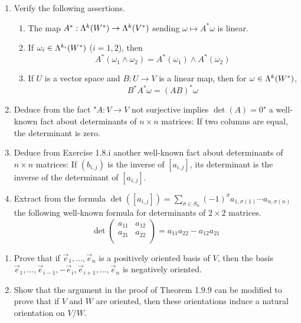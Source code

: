 \documentclass[../psets.tex]{subfiles}
\begin{document}
\begin{enumerate}[label={\textbf{1.8.\roman*.}}]
    \item Verify the following assertions.
    \begin{enumerate}
        \item The map $A^*:\lam[k]{W^*}\to\lam[k]{V^*}$ sending $\omega\mapsto A^*\omega$ is linear.
        \item If $\omega_i\in\lam[k_i]{W^*}$ ($i=1,2$), then
        \begin{equation*}
            A^*(\omega_1\wedge\omega_2) = A^*(\omega_1)\wedge A^*(\omega_2)
        \end{equation*}
        \item If $U$ is a vector space and $B:U\to V$ is a linear map, then for $\omega\in\lam[k]{W^*}$,
        \begin{equation*}
            B^*A^*\omega = (AB)^*\omega
        \end{equation*}
    \end{enumerate}
    \item Deduce from the fact "$A:V\to V$ not surjective implies $\det(A)=0$" a well-known fact about determinants of $n\times n$ matrices: If two columns are equal, the determinant is zero.
    \item Deduce from Exercise 1.8.i another well-known fact about determinants of $n\times n$ matrices: If $(b_{i,j})$ is the inverse of $[a_{i,j}]$, its determinant is the inverse of the determinant of $[a_{i,j}]$.
    \item Extract from the formula $\det([a_{i,j}])=\sum_{\sigma\in S_n}(-1)^\sigma a_{1,\sigma(1)}\cdots a_{n,\sigma(n)}$ the following well-known formula for determinants of $2\times 2$ matrices.
    \begin{equation*}
        \det
        \begin{pmatrix}
            a_{11} & a_{12}\\
            a_{21} & a_{22}\\
        \end{pmatrix}
        = a_{11}a_{22}-a_{12}a_{21}
    \end{equation*}
\end{enumerate}
\begin{enumerate}[label={\textbf{1.9.\roman*.}}]
    \item Prove that if $\vec{e}_1,\dots,\vec{e}_n$ is a positively oriented basis of $V$, then the basis $\vec{e}_1,\dots,\vec{e}_{i-1},-\vec{e}_i,\vec{e}_{i+1},\dots,\vec{e}_n$ is negatively oriented.
    \item Show that the argument in the proof of Theorem 1.9.9 can be modified to prove that if $V$ and $W$ are oriented, then these orientations induce a natural orientation on $V/W$.
\end{enumerate}
\end{document}
